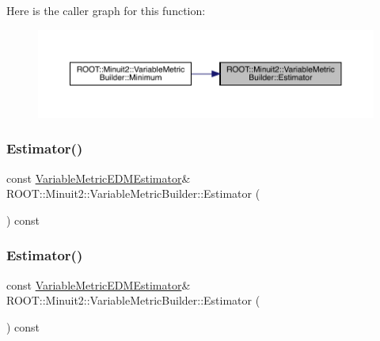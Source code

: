 Here is the caller graph for this function\+:
\nopagebreak
\begin{figure}[H]
\begin{center}
\leavevmode
\includegraphics[width=350pt]{d5/d52/classROOT_1_1Minuit2_1_1VariableMetricBuilder_a2440f7838cbff6043ee58272890aa210_icgraph}
\end{center}
\end{figure}
\mbox{\label{classROOT_1_1Minuit2_1_1VariableMetricBuilder_a2440f7838cbff6043ee58272890aa210}} 
\subsubsection{\texorpdfstring{Estimator()}{Estimator()}\hspace{0.1cm}{\footnotesize\ttfamily [2/3]}}
{\footnotesize\ttfamily const \mbox{\hyperlink{classROOT_1_1Minuit2_1_1VariableMetricEDMEstimator}{Variable\+Metric\+E\+D\+M\+Estimator}}\& R\+O\+O\+T\+::\+Minuit2\+::\+Variable\+Metric\+Builder\+::\+Estimator (\begin{DoxyParamCaption}{ }\end{DoxyParamCaption}) const\hspace{0.3cm}{\ttfamily [inline]}}

\mbox{\label{classROOT_1_1Minuit2_1_1VariableMetricBuilder_a2440f7838cbff6043ee58272890aa210}} 
\subsubsection{\texorpdfstring{Estimator()}{Estimator()}\hspace{0.1cm}{\footnotesize\ttfamily [3/3]}}
{\footnotesize\ttfamily const \mbox{\hyperlink{classROOT_1_1Minuit2_1_1VariableMetricEDMEstimator}{Variable\+Metric\+E\+D\+M\+Estimator}}\& R\+O\+O\+T\+::\+Minuit2\+::\+Variable\+Metric\+Builder\+::\+Estimator (\begin{DoxyParamCaption}{ }\end{DoxyParamCaption}) const\hspace{0.3cm}{\ttfamily [inline]}}

